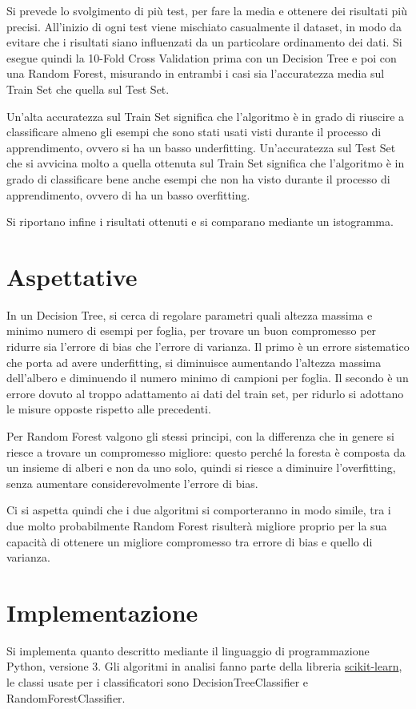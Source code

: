 \documentclass[]{article}
\begin{document}
Si prevede lo svolgimento di più test, per fare la media e ottenere dei risultati più precisi. All'inizio di ogni test viene mischiato casualmente il dataset, in modo da evitare che i risultati siano influenzati da un particolare ordinamento dei dati. Si esegue quindi la 10-Fold Cross Validation prima con un Decision Tree e poi con una Random Forest, misurando in entrambi i casi sia l'accuratezza media sul Train Set che quella sul Test Set.

Un'alta accuratezza sul Train Set significa che l'algoritmo è in grado di riuscire a classificare almeno gli esempi che sono stati usati visti durante il processo di apprendimento, ovvero si ha un basso underfitting. Un'accuratezza sul Test Set che si avvicina molto a quella ottenuta sul Train Set significa che l'algoritmo è in grado di classificare bene anche esempi che non ha visto durante il processo di apprendimento, ovvero di ha un basso overfitting.

Si riportano infine i risultati ottenuti e si comparano mediante un istogramma. 

\section*{Aspettative}
In un Decision Tree, si cerca di regolare parametri quali altezza massima e minimo numero di esempi per foglia, per trovare un buon compromesso per ridurre sia l'errore di bias che l'errore di varianza. Il primo è un errore sistematico che porta ad avere underfitting, si diminuisce aumentando l'altezza massima dell'albero e diminuendo il numero minimo di campioni per foglia. Il secondo è un errore dovuto al troppo adattamento ai dati del train set, per ridurlo si adottano le misure opposte rispetto alle precedenti.

Per Random Forest valgono gli stessi principi, con la differenza che in genere si riesce a trovare un compromesso migliore: questo perché la foresta è composta da un insieme di alberi e non da uno solo, quindi si riesce a diminuire l'overfitting, senza aumentare considerevolmente l'errore di bias.

Ci si aspetta quindi che i due algoritmi si comporteranno in modo simile, tra i due molto probabilmente Random Forest risulterà migliore proprio per la sua capacità di ottenere un migliore compromesso tra errore di bias e quello di varianza.

\section*{Implementazione}
Si implementa quanto descritto mediante il linguaggio di programmazione Python, versione 3.
Gli algoritmi in analisi fanno parte della libreria \href{http://scikit-learn.org}{scikit-learn}, le classi usate per i classificatori sono DecisionTreeClassifier e RandomForestClassifier.
\end{document}
